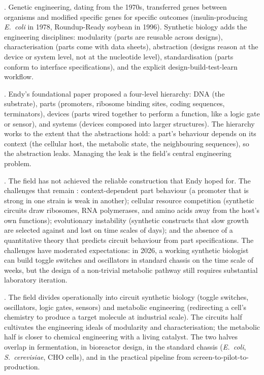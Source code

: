 . Genetic
engineering, dating from the 1970s, transferred genes between
organisms and modified specific genes for specific outcomes
(insulin-producing \emph{E.\ coli} in 1978, Roundup-Ready soybean
in 1996). Synthetic biology adds the engineering disciplines:
modularity (parts are reusable across designs), characterisation
(parts come with data sheets), abstraction (designs reason at the
device or system level, not at the nucleotide level), standardisation
(parts conform to interface specifications), and the explicit
design-build-test-learn workflow.

. Endy's foundational paper
\cite[pp.~451--452]{paper:v6c09-endy-foundations-2005} proposed a four-level
hierarchy: DNA (the substrate), parts (promoters, ribosome binding
sites, coding sequences, terminators), devices (parts wired together
to perform a function, like a logic gate or sensor), and systems
(devices composed into larger structures). The hierarchy works to
the extent that the abstractions hold: a part's behaviour depends
on its context (the cellular host, the metabolic state, the
neighbouring sequences), so the abstraction leaks. Managing the
leak is the field's central engineering problem.

. The field has not
achieved the reliable construction that Endy hoped for. The
challenges that remain
\cite[ch.~1]{text:v6c09-alon-systems-biology-2019}: context-dependent part
behaviour (a promoter that is strong in one strain is weak in
another); cellular resource competition (synthetic circuits draw
ribosomes, RNA polymerases, and amino acids away from the host's
own functions); evolutionary instability (synthetic constructs that
slow growth are selected against and lost on time scales of days);
and the absence of a quantitative theory that predicts circuit
behaviour from part specifications. The challenges have moderated
expectations: in 2026, a working synthetic biologist can build
toggle switches and oscillators in standard chassis on the time scale
of weeks, but the design of a non-trivial metabolic pathway still
requires substantial laboratory iteration.

. The field divides operationally
into circuit synthetic biology (toggle switches, oscillators, logic
gates, sensors) and metabolic engineering (redirecting a cell's
chemistry to produce a target molecule at industrial scale). The
circuits half cultivates the engineering ideals of modularity and
characterisation; the metabolic half is closer to chemical
engineering with a living catalyst. The two halves overlap in
fermentation, in bioreactor design, in the standard chassis
(\emph{E.\ coli}, \emph{S.\ cerevisiae}, CHO cells), and in the
practical pipeline from screen-to-pilot-to-production.

